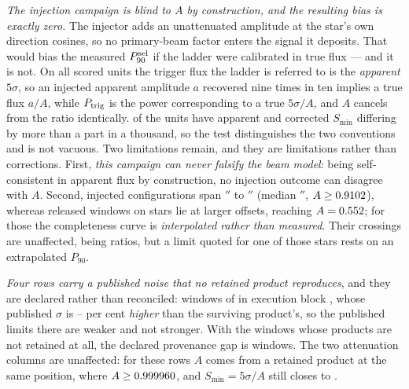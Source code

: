 \emph{The injection campaign is blind to $A$ by construction, and the
resulting bias is exactly zero.} The injector adds an unattenuated amplitude
at the star's own direction cosines, so no primary-beam factor enters the
signal it deposits. That would bias the measured $P_{90}^{\rm sel}$ if the
ladder were calibrated in true flux --- and it is not. On all \PbInjNUnit{}
scored units the trigger flux the ladder is referred to is the \emph{apparent}
$5\sigma$, so an injected apparent amplitude $a$ recovered nine times in ten
implies a true flux $a/A$, while $P_{\rm trig}$ is the power corresponding to
a true $5\sigma/A$, and $A$ cancels from the ratio identically. \PbInjNDistinct{}
of the \PbInjNUnit{} units have apparent and corrected $S_{\min}$ differing by
more than a part in a thousand, so the test distinguishes the two conventions
and is not vacuous. Two limitations remain, and they are limitations rather
than corrections. First, \emph{this campaign can never falsify the beam
model}: being self-consistent in apparent flux by construction, no injection
outcome can disagree with $A$. Second, injected configurations span
\PbInjOffMin$''$ to \PbInjOffMax$''$ (median \PbInjOffMed$''$,
$A\ge0.9102$), whereas \PbNBeyond{} released windows on \PbNBeyondStar{}
stars lie at larger offsets, reaching $A=0.552$; for those the
completeness curve is \emph{interpolated rather than measured}. Their
\PbNBeyondCross{} crossings are unaffected, being ratios, but a limit quoted
for one of those stars rests on an extrapolated $P_{90}$.

\emph{Four rows carry a published noise that no retained product
reproduces}, and they are declared rather than reconciled: \PbGapN{} windows
of \PbGapStar{} in execution block \texttt{\PbGapEb}, whose published
$\sigma$ is \PbGapPctLo--\PbGapPctHi{} per cent \emph{higher} than the
surviving product's, so the published limits there are weaker and not
stronger. With the \PbGapNoProd{} windows whose products are not retained at
all, the declared provenance gap is \PbGapDeclared{} windows. The two
attenuation columns are unaffected: for these rows $A$ comes from a retained
product at the same position, where $A\ge0.999960$, and
$S_{\min}=5\sigma/A$ still closes to \PbGapSminRes.

